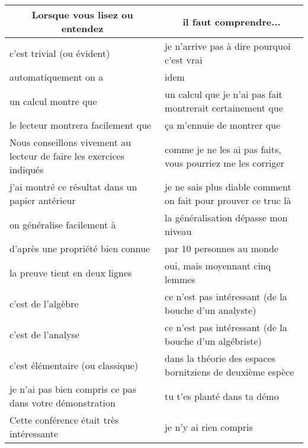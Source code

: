	\begin{table}[H]
	\begin{center}
			\begin{tabular}{|p{7.5cm}|p{7.5cm}|}
				\hline
				\multicolumn{1}{c}{\cellcolor{black!30}\textbf{
Lorsque vous lisez ou entendez}} & 
  \multicolumn{1}{c}{\cellcolor{black!30}\textbf{il faut comprendre...}} \\ \hline
				c'est trivial (ou évident) & je n'arrive pas à dire pourquoi c'est vrai \\ \hline
				automatiquement on a & idem \\ \hline
				un calcul montre que & un calcul que je n'ai pas fait montrerait certainement que\\ \hline
				le lecteur montrera facilement que & ça m'ennuie de montrer que\\ \hline
				Nous conseillons vivement au lecteur de faire les exercices indiqués & comme je ne les ai pas faits, vous pourriez me les corriger\\ \hline
				j'ai montré ce résultat dans un papier antérieur & je ne sais plus diable comment on fait pour prouver ce truc là
				\\ \hline
				on généralise facilement à & la généralisation dépasse mon niveau			
				\\ \hline
				d'après une propriété bien connue & par 10 personnes au monde
				\\ \hline
				la preuve tient en deux lignes & 	oui, mais moyennant cinq lemmes
				\\ \hline
				c'est de l'algèbre & ce n'est pas intéressant (de la bouche d'un analyste)
				\\ \hline
				c'est de l'analyse & ce n'est pas intéressant (de la bouche d'un algébriste)
				\\ \hline
				c'est élémentaire (ou classique) & dans la théorie des espaces bornitziens de deuxième espèce
				\\ \hline
				je n'ai pas bien compris ce pas dans votre démonstration & tu t'es planté dans ta démo
				\\ \hline
				Cette conférence était très intéressante & 	je n'y ai rien compris
				\\ \hline
		\end{tabular}
	\end{center}
	\end{table}	
	
	\begin{center}\underline{\hspace{5 cm}}\end{center}
	
